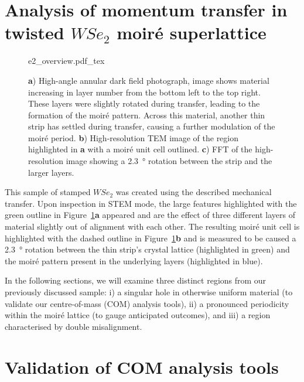 \section{Analysis of momentum transfer in twisted $WSe_2$ moiré superlattice}

\begin{figure}
    \centering
    \def\svgwidth{.95\linewidth}
    {e2_overview.pdf_tex}
    \caption{\textbf{a}) High-angle annular dark field photograph, image shows material increasing in layer number from the bottom left to the top right. These layers were slightly rotated during transfer, leading to the formation of the moiré pattern. Across this material, another thin strip has settled during transfer, causing a further modulation of the moiré period. \textbf{b}) High-resolution TEM image of the region highlighted in \textbf{a} with a moiré unit cell outlined. \textbf{c}) FFT of the high-resolution image showing a \SI{2.3}{\degree} rotation between the strip and the larger layers.}
    \label{fig:dub_moire}
\end{figure}

This sample of stamped $WSe_2$ was created using the described mechanical transfer. Upon inspection in STEM mode, the large features highlighted with the green outline in Figure~\ref{fig:dub_moire}\textbf{a} appeared and are the effect of three different layers of material slightly out of alignment with each other. 
%
The resulting moiré unit cell is highlighted with the dashed outline in Figure~\ref{fig:dub_moire}\textbf{b} and is measured to be caused a \SI{2.3}{\degree} rotation between the thin strip's crystal lattice (highlighted in green) and the moiré pattern present in the underlying layers (highlighted in blue).


In the following sections, we will examine three distinct regions from our previously discussed sample: i) a singular hole in otherwise uniform material (to validate our centre-of-mass (COM) analysis tools), ii) a pronounced periodicity within the moiré lattice (to gauge anticipated outcomes), and  iii) a region characterised by double misalignment.

\section{Validation of COM analysis tools}

